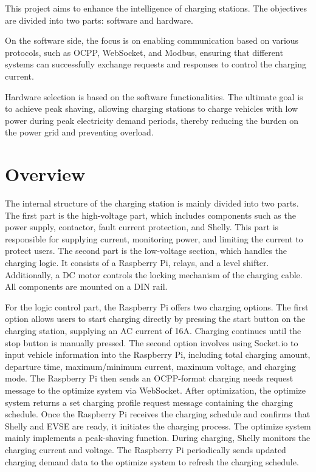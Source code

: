 \documentclass[
english,
ruledheaders=section,%
class=report,%
thesis={type=Report},%
accentcolor=9c,%
custommargins=true,%
marginpar=false,%
parskip=half-,%
fontsize=11pt,%
logofile={img/tuda_logo.pdf}, %
]{tudapub}
\begin{document}
    This project aims to enhance the intelligence of charging stations. The objectives are divided into two parts: software and hardware.

    On the software side, the focus is on enabling communication based on various protocols, such as OCPP, WebSocket, and Modbus, ensuring that different systems can successfully exchange requests and responses to control the charging current.

    Hardware selection is based on the software functionalities. The ultimate goal is to achieve peak shaving, allowing charging stations to charge vehicles with low power during peak electricity demand periods, thereby reducing the burden on the power grid and preventing overload.

    \section{Overview}

    The internal structure of the charging station is mainly divided into two parts. The first part is the high-voltage part, which includes components such as the power supply, contactor, fault current protection, and Shelly. This part is responsible for supplying current, monitoring power, and limiting the current to protect users. The second part is the low-voltage section, which handles the charging logic. It consists of a Raspberry Pi, relays, and a level shifter. Additionally, a DC motor controls the locking mechanism of the charging cable. All components are mounted on a DIN rail.

    For the logic control part, the Raspberry Pi offers two charging options. The first option allows users to start charging directly by pressing the start button on the charging station, supplying an AC current of 16A. Charging continues until the stop button is manually pressed. The second option involves using Socket.io to input vehicle information into the Raspberry Pi, including total charging amount, departure time, maximum/minimum current, maximum voltage, and charging mode. The Raspberry Pi then sends an OCPP-format charging needs request message to the optimize system via WebSocket. After optimization, the optimize system returns a set charging profile request message containing the charging schedule. Once the Raspberry Pi receives the charging schedule and confirms that Shelly and EVSE are ready, it initiates the charging process. The optimize system mainly implements a peak-shaving function. During charging, Shelly monitors the charging current and voltage. The Raspberry Pi periodically sends updated charging demand data to the optimize system to refresh the charging schedule.
\end{document}
